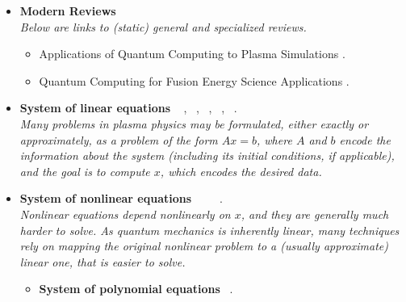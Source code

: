 \documentclass[12pt,letterpaper]{article}
\begin{document}
\newpage
\begin{itemize} 

	\item \textbf{Modern Reviews}
		\\\textit{Below are links to (static) general and specialized reviews.}
		\begin{itemize} 
			\item Applications of Quantum Computing to Plasma Simulations \cite{dodinApplicationsQuantumComputing2021}.
            \item Quantum Computing for Fusion Energy Science Applications \cite{josephQuantumComputingFusion2022a}.
		\end{itemize}
    
	\item \textbf{System of linear equations}  ~\cite{huangNeartermQuantumAlgorithms2021} \cite{bravo-prietoVariationalQuantumLinear2020,xuVariationalAlgorithmsLinear2021},  ~\cite{harrowQuantumAlgorithmLinear2009,claderPreconditionedQuantumLinear2013,childsQuantumAlgorithmSystems2017,wangEfficientQuantumAlgorithms2022},  ~\cite{subasiQuantumAlgorithmsSystems2019}, ~\cite{borleHowViableQuantum2022},  ~\cite{shaoFasterQuantuminspiredAlgorithms2021}.
    \\\emph{Many problems in plasma physics may be formulated, either exactly or approximately, as a problem of the form $A x = b$, where $A$ and $b$ encode the information about the system (including its initial conditions, if applicable), and the goal is to compute $x$, which encodes the desired data.}
 
	\item \textbf{System of nonlinear equations} ~ ~\cite{dodinQuantumComputationNonlinear2021} ~\cite{xueQuantumNewtonMethod2021,xueQuantumAlgorithmSolving2022}.
    \\\emph{Nonlinear equations depend nonlinearly on $x$, and they are generally much harder to solve. As quantum mechanics is inherently linear, many techniques rely on mapping the original nonlinear problem to a (usually approximate) linear one, that is easier to solve.}
		\begin{itemize} 
			\item \textbf{System of polynomial equations}  ~\cite{changQuantumAnnealingSystems2019}.
   

\end{itemize}
\end{itemize}
\end{document}
